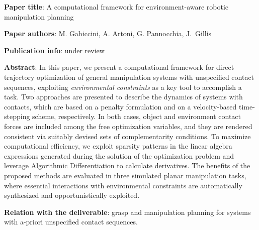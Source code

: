 
\item
\begin{list}{\quad}{}
\item \textbf{Paper title}: A computational framework for environment-aware robotic manipulation planning
\item \textbf{Paper authors}: M. Gabiccini, A. Artoni, G. Pannocchia, J.~Gillis
\item\textbf{Publication info}: under review
\item\textbf{Abstract}:
In this paper, we present a computational framework for direct trajectory optimization of general manipulation systems with unspecified contact sequences, exploiting \emph{environmental constraints} as a key tool to accomplish a task.
Two approaches are presented to describe the dynamics of systems with contacts, which are based on a penalty formulation and on a velocity-based time-stepping scheme, respectively. In  both cases, object and environment contact forces are included among the free optimization variables, and they are rendered consistent via suitably devised sets of complementarity conditions.
To maximize computational efficiency, we exploit sparsity patterns in the linear algebra expressions generated during the solution of the optimization problem and leverage Algorithmic Differentiation to calculate derivatives. %
The benefits of the proposed methods are evaluated in three simulated planar manipulation tasks, where essential interactions with environmental constraints are automatically synthesized and opportunistically exploited.
\item \textbf{Relation with the deliverable}: grasp and manipulation planning for systems with a-priori unspecified contact sequences.
\end{list} 